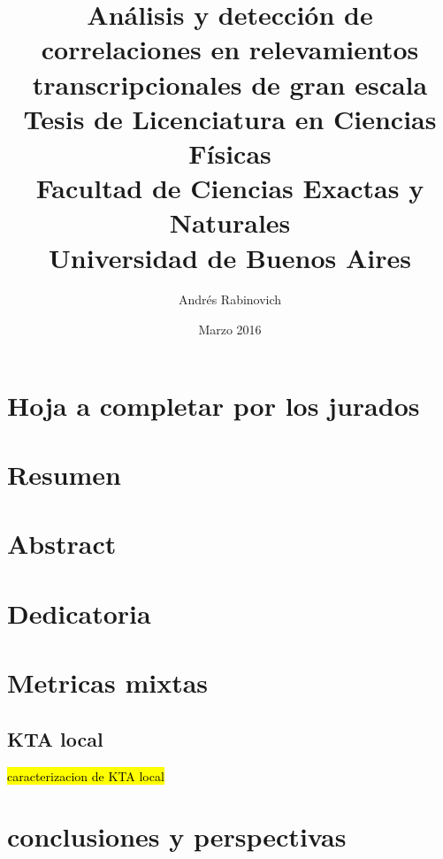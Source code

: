 \documentclass[12pt]{report}
\title{
	{\large Análisis y detección de correlaciones en relevamientos transcripcionales de gran escala}\\
    {Tesis de Licenciatura en Ciencias Físicas}\\
	{\large Facultad de Ciencias Exactas y Naturales}\\
	{\large Universidad de Buenos Aires}
}
\author{Andrés Rabinovich}
\date{Marzo 2016}
\newcommand{\paginaenblanco}{\clearpage\mbox{}\newpage}
\begin{document}
\maketitle
\paginaenblanco
\chapter*{Hoja a completar por los jurados}
\paginaenblanco
\chapter*{Resumen}
\paginaenblanco
\chapter*{Abstract}
\paginaenblanco
\chapter*{Dedicatoria}
\paginaenblanco

\tableofcontents






\chapter{Metricas mixtas}
\section{KTA local}
\hl{caracterizacion de KTA local}

\chapter{conclusiones y perspectivas}
\clearpage


\end{document}
